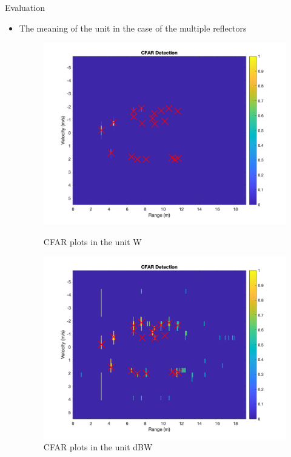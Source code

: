 \documentclass{beamer}
\begin{document}
\begin{frame}[t]{Evaluation}
	\begin{itemize}
	    \item The meaning of the unit in the case of the multiple reflectors
        \vspace{0.5\baselineskip}
            \begin{figure}
                \centering
                \begin{minipage}{0.45\textwidth}
                    \centering
                    \includegraphics[height=0.8\textwidth]{figures/5c_octahedral.png}
                    \caption{CFAR plots in the unit W}
                \end{minipage}
                \begin{minipage}{0.45\textwidth}
                    \centering
                    \includegraphics[height=0.8\textwidth]{figures/5c_octahedral_dBW.png}
                    \caption{CFAR plots in the unit dBW}
                \end{minipage}
            \end{figure}
	\end{itemize}
\end{frame}
\end{document}
